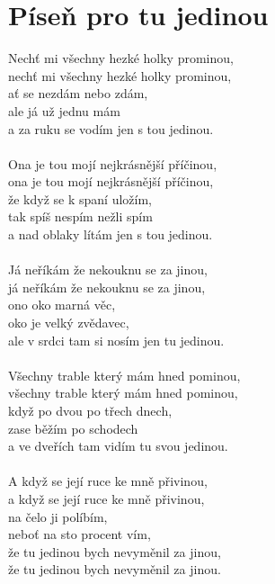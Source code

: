 \section{Píseň pro tu jedinou}
Nechť mi všechny hezké holky prominou,\\
nechť mi všechny hezké holky prominou,\\
ať se nezdám nebo zdám,\\
ale já už jednu mám\\
a za ruku se vodím jen s tou jedinou.\\
\\
Ona je tou mojí nejkrásnější příčinou,\\
ona je tou mojí nejkrásnější příčinou,\\
že když se k spaní uložím,\\
tak spíš nespím nežli spím\\
a nad oblaky lítám jen s tou jedinou.\\
\\
Já neříkám že nekouknu se za jinou,\\
já neříkám že nekouknu se za jinou,\\
ono oko marná věc,\\
oko je velký zvědavec,\\
ale v srdci tam si nosím jen tu jedinou.\\
\\
Všechny trable který mám hned pominou,\\
všechny trable který mám hned pominou,\\
když po dvou po třech dnech,\\
zase běžím po schodech\\
a ve dveřích tam vidím tu svou jedinou.\\
\\
A když se její ruce ke mně přivinou,\\
a když se její ruce ke mně přivinou,\\
na čelo ji políbím,\\
neboť na sto procent vím,\\
že tu jedinou bych nevyměnil za jinou,\\
že tu jedinou bych nevyměnil za jinou.\\